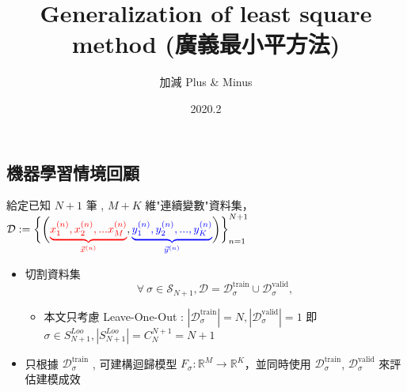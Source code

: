 \documentclass{article}
\begin{document}
\begin{CJK}{UTF8}{bsmi}


\title{Generalization of least square method (廣義最小平方法) }
\date{2020.2}
\author{加減 Plus \& Minus}




\maketitle
\section{機器學習情境回顧}
給定已知 $N+1$ 筆 , $M+K$ 維"連續變數"資料集， $ \mathcal{D}:= \bigg\{\bigg({\color{red}\underbrace{x^{(n)}_1,x^{(n)}_2,...x^{(n)}_M}_{\vec{x}^{(n)}}},{\color{blue}\underbrace{y_{1}^{(n)},y_{2}^{(n)},...,y_{K}^{(n)}}_{\vec{y}^{(n)}}}\bigg)\bigg\}_{n=1}^{N+1}$
\begin{itemize}

\item $\text{切割資料集}$ $$ \forall \  \sigma \in \mathcal{S}_{N+1} , \mathcal{D} =\mathcal{D}^{\text{train}}_{\sigma} \cup \mathcal{D}^{\text{valid}}_{\sigma} ,  $$
\begin{itemize}
\item 本文只考慮 \color{red} Leave-One-Out : $|\mathcal{D}^{\text{train}}_{\sigma}| = N ,  |\mathcal{D}^{\text{valid}}_{\sigma}| = 1  $ 即　$\sigma \in S^{Loo}_{N+1} , |S^{Loo}_{N+1}| = C^{N+1}_{N} = N+1$
\end{itemize}
\item 只根據 $\mathcal{D}^{\text{train}}_{\sigma}$ , 可建構迴歸模型 $F_{\sigma} : \mathbb{R}^{M} \longrightarrow \mathbb{R}^{K} $，並同時使用 $\mathcal{D}^{\text{train}}_{\sigma}$, $\mathcal{D}^{\text{valid}}_{\sigma}$  來評估建模成效


\end{itemize}
\end{CJK}
\end{document}
